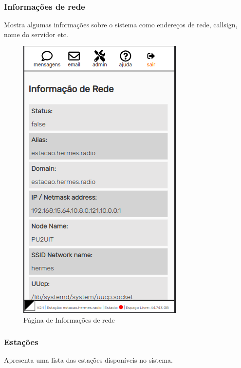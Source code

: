 \documentclass[11pt,a4paper]{article}
\begin{document}
\subsubsection{Informações de rede} 
\label{gui_net_info}

Mostra algumas informações sobre o sistema como endereços de rede, callsign, nome do servidor etc.
     \begin{figure}[H]
     \vspace{-10pt}
    \centering
    \includegraphics[width=0.5\columnwidth]{screenshots/frontend/pt_kn/networkinfo.png}
    \caption{Página de Informações de rede}
    \label{fig:netinfo}
\end{figure}
    

\subsubsection{Estações} 
\label{gui_stations}

Apresenta uma lista das estações disponíveis no sistema. 
\end{document}

